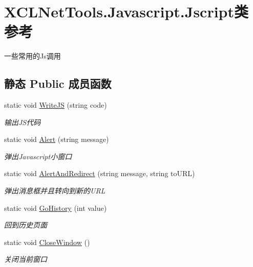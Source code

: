 \hypertarget{class_x_c_l_net_tools_1_1_javascript_1_1_jscript}{}\section{X\+C\+L\+Net\+Tools.\+Javascript.\+Jscript类 参考}
\label{class_x_c_l_net_tools_1_1_javascript_1_1_jscript}


一些常用的\+Js调用  


\subsection*{静态 Public 成员函数}
\begin{DoxyCompactItemize}
\item 
static void \hyperlink{class_x_c_l_net_tools_1_1_javascript_1_1_jscript_a7df1e096fb81b6148d1e89aa56cddc26}{Write\+JS} (string code)
\begin{DoxyCompactList}\small\item\em 输出\+J\+S代码 \end{DoxyCompactList}\item 
static void \hyperlink{class_x_c_l_net_tools_1_1_javascript_1_1_jscript_a8bb91a5a3ddf09a39443e7983f2e8ee2}{Alert} (string message)
\begin{DoxyCompactList}\small\item\em 弹出\+Javascript小窗口 \end{DoxyCompactList}\item 
static void \hyperlink{class_x_c_l_net_tools_1_1_javascript_1_1_jscript_a31b283197fe1f60b11830bea87352b95}{Alert\+And\+Redirect} (string message, string to\+U\+RL)
\begin{DoxyCompactList}\small\item\em 弹出消息框并且转向到新的\+U\+RL \end{DoxyCompactList}\item 
static void \hyperlink{class_x_c_l_net_tools_1_1_javascript_1_1_jscript_a794143737133270bc7c4860789a39713}{Go\+History} (int value)
\begin{DoxyCompactList}\small\item\em 回到历史页面 \end{DoxyCompactList}\item 
static void \hyperlink{class_x_c_l_net_tools_1_1_javascript_1_1_jscript_a3d75ebf33916a6e962f2964e03432fd5}{Close\+Window} ()
\begin{DoxyCompactList}\small\item\em 关闭当前窗口 \end{DoxyCompactList}\item 

\end{DoxyCompactItemize}
